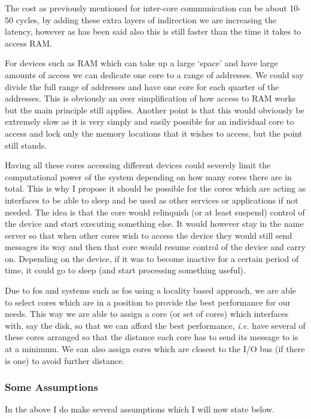 \documentclass[journal]{IEEEtran}
\begin{document}
The cost as previously mentioned for inter-core communication can be about 10-50 cycles, by adding these extra layers of indirection we are increasing the latency, however as has been said also this is still faster than the time it takes to access RAM. 

For devices such as RAM which can take up a large `space' and have large amounts of access we can dedicate one core to a range of addresses. We could say divide the full range of addresses and have one core for each quarter of the addresses. This is obviously an over simplification of how access to RAM works but the main principle still applies. Another point is that this would obviously be extremely slow as it is very simply and easily possible for an individual core to access and lock only the memory locations that it wishes to access, but the point still stands.

Having all these cores accessing different devices could severely limit the computational power of the system depending on how many cores there are in total. This is why I propose it should be possible for the cores which are acting as interfaces to be able to sleep and be used as other services or applications if not needed. The idea is that the core would relinquish (or at least suspend) control of the device and start executing something else. It would however stay in the name server so that when other cores wish to access the device they would still send messages its way and then that core would resume control of the device and carry on. Depending on the device, if it was to become inactive for a certain period of time, it could go to sleep (and start processing something useful). 

Due to fos and systems such as fos using a locality based approach, we are able to select cores which are in a position to provide the best performance for our needs. This way we are able to assign a core (or set of cores) which interfaces with, say the disk, so that we can afford the best performance, \emph{i.e.} have several of these cores arranged so that the distance each core has to send its message to is at a minimum. We can also assign cores which are closest to the I/O bus (if there is one) to avoid further distance. 

\subsubsection{Some Assumptions}
In the above I do make several assumptions which I will now state below.
\end{document}
